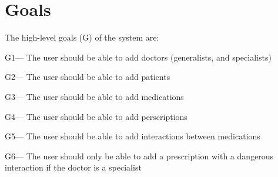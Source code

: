 \section{Goals}

The high-level goals (G) of the system are:

\begin{mylist}
\item G1--- The user should be able to add doctors (generalists, and specialists)

\item G2--- The user should be able to add patients

\item G3--- The user should be able to add medications

\item G4--- The user should be able to add perscriptions

\item G5--- The user should be able to add interactions between medications

\item G6--- The user should only be able to add a prescription with a dangerous interaction if the doctor is a specialist

\end{mylist}